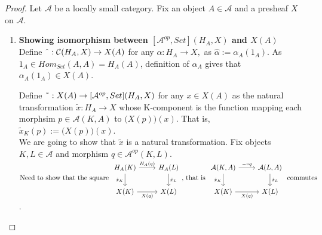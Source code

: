 \documentclass[18pt,a4paper]{article}
\theoremstyle{definition}
\begin{document}
\begin{proof}Let $\mathcal{A} $ be a locally small category.
	Fix an object $A \in \mathcal{A} $ and a presheaf $X$ on $\mathcal{A}$.

	\begin{enumerate}[label=\Roman*]
		\item \textbf{Showing isomorphism between $[\mathcal{A}^{op},Set](H_A,X)$
			and $X(A)$}\\
	Define $\string ^ :\mathcal{C}(H_A,X) \to X(A) $
	for any $\alpha:H_A \to X,$ as  $\hat{\alpha}:= \alpha_A(1_A)$.
	As $1_A \in Hom_{Set}(A,A)=H_A(A)$,
	definition of $\alpha_A$ gives that $\alpha_A(1_A)\in X(A)$.

	Define $\string ~ : X(A) \to [\mathcal{A}^{op}, Set](H_A,X)$
	for any $ x \in X(A)$ as the natural transformation $\tilde{x} : H_A \to X$ whose
	K-component is the function mapping each morphsim $p \in \mathcal{A}(K,A)$
	to $\Big(X(p)\Big)(x)$. That is, $\tilde{x}_K (p):=\Big(X(p)\Big)(x)$.\\

	We are going to show that $\tilde{x}$ is a natural transformation.
	Fix objects $K,L \in \mathcal{A} $ and morphism $q \in \mathcal{A}^{op}(K,L)$.
	$\text{Need to show that the square }
	\begin{tikzcd}
		H_A(K) \arrow[swap]{d}{\tilde{x}_K} \arrow{r}{H_A(q)}
		& H_A(L) \arrow{d}{\tilde{x}_L}\\
		X(K) \arrow[swap]{r}{X(q)}
		& X(L)
	\end{tikzcd} \text{, that is }
	\begin{tikzcd}
		\mathcal{A}(K,A) \arrow[swap]{d}{\tilde{x}_K} \arrow{r}{ - \circ q}
		& \mathcal{A} (L,A) \arrow{d}{\tilde{x}_L}\\
		X(K) \arrow[swap]{r}{X(q)}
		& X(L)
	\end{tikzcd}\text{ commutes }$.\\


\end{enumerate}
\end{proof}
\end{document}
